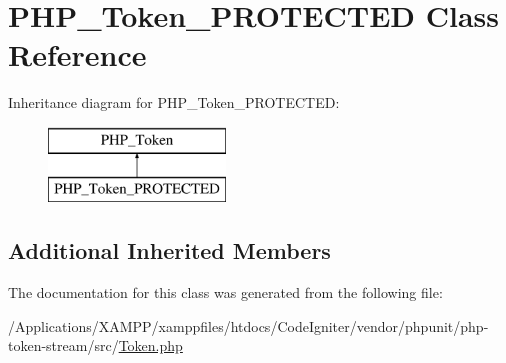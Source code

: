 \hypertarget{class_p_h_p___token___p_r_o_t_e_c_t_e_d}{}\section{P\+H\+P\+\_\+\+Token\+\_\+\+P\+R\+O\+T\+E\+C\+T\+ED Class Reference}
\label{class_p_h_p___token___p_r_o_t_e_c_t_e_d}
Inheritance diagram for P\+H\+P\+\_\+\+Token\+\_\+\+P\+R\+O\+T\+E\+C\+T\+ED\+:\begin{figure}[H]
\begin{center}
\leavevmode
\includegraphics[height=2.000000cm]{class_p_h_p___token___p_r_o_t_e_c_t_e_d}
\end{center}
\end{figure}
\subsection*{Additional Inherited Members}


The documentation for this class was generated from the following file\+:\begin{DoxyCompactItemize}
\item 
/\+Applications/\+X\+A\+M\+P\+P/xamppfiles/htdocs/\+Code\+Igniter/vendor/phpunit/php-\/token-\/stream/src/\mbox{\hyperlink{_token_8php}{Token.\+php}}\end{DoxyCompactItemize}
